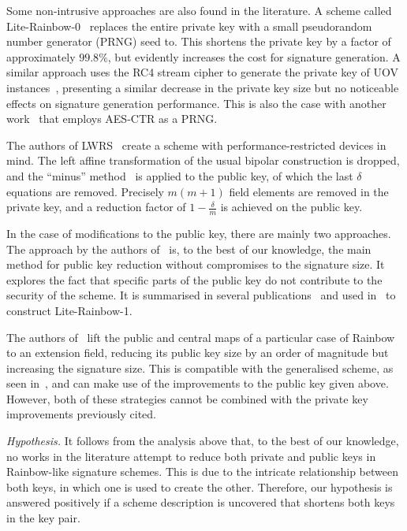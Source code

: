 \documentclass[draft, 12pt, a4paper, oneside]{memoir}
\begin{document}
Some non-intrusive approaches are also found in the literature. A scheme called Lite-Rainbow-0~\cite{} replaces the entire private key with a small pseudorandom number generator (PRNG) seed to. This shortens the private key by a factor of approximately $99.8\%$, but evidently increases the cost for signature generation. A similar approach uses the RC4 stream cipher to generate the private key of UOV instances~\cite{}, presenting a similar decrease in the private key size but no noticeable effects on signature generation performance. This is also the case with another work~\cite{} that employs AES-CTR as a PRNG.

The authors of LWRS~\cite{} create a scheme with performance-restricted devices in mind. The left affine transformation of the usual bipolar construction is dropped, and the ``minus'' method~\cite[Subsection 3.2.1]{} is applied to the public key, of which the last $\delta$ equations are removed. Precisely $m (m + 1)$ field elements are removed in the private key, and a reduction factor of $1 - \frac{\delta}{m}$ is achieved on the public key. %

In the case of modifications to the public key, there are mainly two approaches.
The approach by the authors of~\cite{Petzoldt:201006:inproc} is, to the best of 
our knowledge, the main method for public key reduction without compromises to
the signature size. It explores the fact that specific parts of the public key
do not contribute to the security of the scheme. It is summarised in several
publications~\cite{Petzoldt:201012:inproc,Petzoldt:201103:inproc,Petzoldt:201211:inproc,Petzoldt:201307:phd}
and used in~\cite{Shim:201512:inproc} to construct Lite-Rainbow-1.

The authors of~\cite{Szepieniec:201706:inproc} lift the public and central maps
of a particular case of Rainbow to an extension field, reducing its public 
key size by an order of magnitude but increasing the signature size. This is 
compatible with the generalised scheme, as seen in~\cite{Beullens:201706:msc,Beullens:201712:inproc},
and can make use of the improvements to the public key given above. However,
both of these strategies cannot be combined with the private key improvements
previously cited. 

\emph{Hypothesis.} It follows from the analysis above that, to the best of our knowledge, no works in the literature attempt to reduce both private and public keys in Rainbow-like signature schemes. This is due to the intricate relationship between both keys, in which one is used to create the other. Therefore, our hypothesis is answered positively if a scheme description is uncovered that shortens both keys in the key pair.
\end{document}
